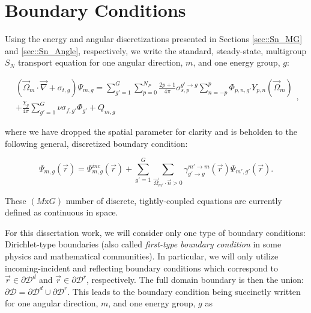 \section{Boundary Conditions}
\label{sec::Sn_BC}

Using the energy and angular discretizations presented in Sections \ref{sec::Sn_MG} and \ref{sec::Sn_Angle}, respectively, we write the standard, steady-state, multigroup $S_N$ transport equation for one angular direction, $m$, and one energy group, $g$:

\begin{equation}
\label{eq::Sn_mg_sn_trans_eq}
\begin{aligned}
	 \left( \vec{\Omega}_m \cdot \vec{\nabla}  + \sigma_{t,g}  \right)  \Psi_{m,g}= \sum_{g'=1}^{G} \sum_{p=0}^{N_P} \frac{2p + 1}{4 \pi} \sigma_{s,p}^{g' \rightarrow g}   \sum_{n=-p}^{p}  \Phi_{p,n,g'}  Y_{p,n} (  \vec{\Omega}_m )  \\
	+ \frac{\chi_g}{4 \pi} \sum_{g'=1}^{G} \nu \sigma_{f,g'} \Phi_{g'}   + Q_{m,g}
\end{aligned} , 
\end{equation}

\noindent where we have dropped the spatial parameter for clarity and is beholden to the following general, discretized boundary condition:

\begin{equation}
\label{eq::Sn_mg_sn_trans_eq_bc}
\Psi_{m,g} (\vec{r}) = \Psi^{inc}_{m,g} (\vec{r}) + \sum_{g'=1}^{G} \sum_{\vec{\Omega}_{m'} \cdot \vec{n} > 0} \gamma_{g' \rightarrow g}^{m' \rightarrow m} (\vec{r})  \Psi_{m',g'} (\vec{r})  .
\end{equation}

\noindent These $(M \text{x} G)$ number of discrete, tightly-coupled equations are currently defined as continuous in space.

For this dissertation work, we will consider only one type of boundary conditions: Dirichlet-type boundaries (also called {\em first-type boundary condition} in some physics and mathematical communities). In particular, we will only utilize incoming-incident and reflecting boundary conditions which correspond to $\vec{r} \in \partial \mathcal{D}^d$ and $\vec{r} \in \partial \mathcal{D}^r$, respectively. The full domain boundary is then the union: $\partial \mathcal{D} = \partial \mathcal{D}^d \cup \partial \mathcal{D}^r$. This leads to the boundary condition being succinctly written for one angular direction, $m$, and one energy group, $g$ as

